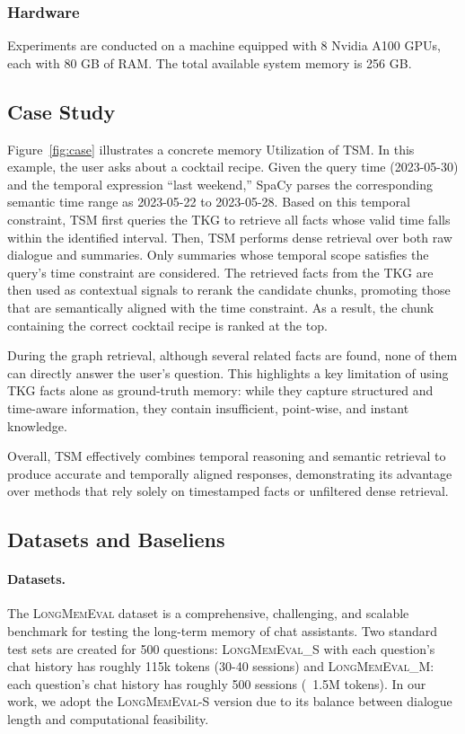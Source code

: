 \documentclass[11pt]{article}
\newcommand{\ours}[1]{TSM}
\begin{document}
\subsubsection{Hardware}
Experiments are conducted on a machine equipped with 8 Nvidia A100 GPUs, each with 80 GB of RAM. The total available system memory is 256 GB.



\subsection{Case Study}

Figure~\ref{fig:case} illustrates a concrete memory Utilization of \ours{}. In this example, the user asks about a cocktail recipe. Given the query time (2023-05-30) and the temporal expression “last weekend,” SpaCy parses the corresponding semantic time range as 2023-05-22 to 2023-05-28.
Based on this temporal constraint, \ours{} first queries the TKG to retrieve all facts whose valid time falls within the identified interval.
Then, \ours{} performs dense retrieval over both raw dialogue and summaries. Only summaries whose temporal scope satisfies the query’s time constraint are considered. The retrieved facts from the TKG are then used as contextual signals to rerank the candidate chunks, promoting those that are semantically aligned with the time constraint. As a result, the chunk containing the correct cocktail recipe is ranked at the top.

During the graph retrieval, although several related facts are found, none of them can directly answer the user’s question. This highlights a key limitation of using TKG facts alone as ground-truth memory: while they capture structured and time-aware information, they contain insufficient, point-wise, and instant knowledge.

Overall, \ours{} effectively combines temporal reasoning and semantic retrieval to produce accurate and temporally aligned responses, demonstrating its advantage over methods that rely solely on timestamped facts or unfiltered dense retrieval.


\subsection{Datasets and Baseliens}
\paragraph{Datasets.}
The \textsc{LongMemEval} dataset is a comprehensive, challenging, and scalable benchmark for testing the long-term memory of chat assistants.
Two standard test sets are created for 500 questions:
\textsc{LongMemEval\_S} with each question's chat history has roughly 115k tokens (30-40 sessions) and \textsc{LongMemEval\_M}: each question's chat history has roughly 500 sessions (~1.5M tokens).
In our work, we adopt the \textsc{LongMemEval-S} version due to its balance between dialogue length and computational feasibility.
\end{document}
